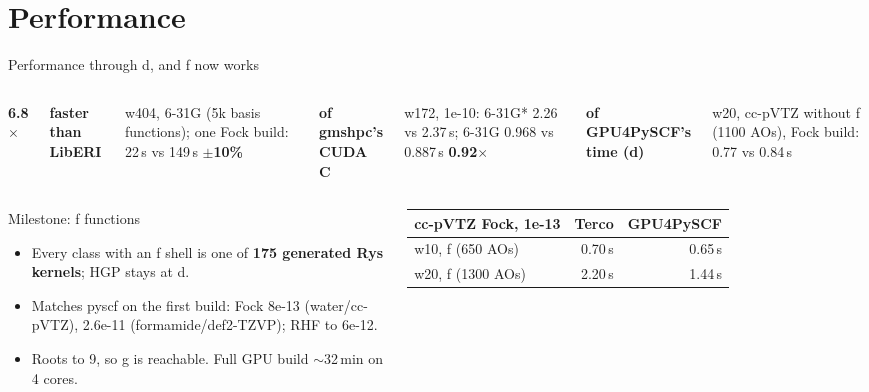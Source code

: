 \documentclass[aspectratio=169]{beamer}
\newcommand{\bignum}[2][fortranPurple]{{\fontsize{30}{32}\selectfont\bfseries\color{#1}#2}}
\newcommand{\cplx}[1]{{\footnotesize\color{cookieMuted}#1}}
\begin{document}
\section{Performance}

\begin{frame}{Performance through d, and f now works}
  \begin{columns}[T,onlytextwidth]
      \bignum{6.8$\times$}\par
      \textbf{faster than LibERI}\par
      \cplx{w404, 6-31G (5k basis functions); one Fock build: 22\,s vs 149\,s}
      \bignum[fortranPurpleMid]{$\pm$10\%}\par
      \textbf{of gmshpc's CUDA C}\par
      \cplx{w172, 1e-10: 6-31G* 2.26 vs 2.37\,s; 6-31G 0.968 vs 0.887\,s}
      \bignum{0.92$\times$}\par
      \textbf{of GPU4PySCF's time (d)}\par
      \cplx{w20, cc-pVTZ without f (1100 AOs), Fock build: 0.77 vs 0.84\,s}
  \end{columns}
  \vspace{.6em}
  \begin{columns}[T,onlytextwidth]
      \begin{exampleblock}{Milestone: f functions}
        \begin{itemize}\setlength\itemsep{2pt}\small
          \item Every class with an f shell is one of \textbf{175 generated Rys kernels}; HGP stays at d.
          \item Matches pyscf on the first build: Fock 8e-13 (water/cc-pVTZ), 2.6e-11 (formamide/def2-TZVP); RHF to 6e-12.
          \item Roots to 9, so g is reachable. Full GPU build $\sim$32\,min on 4 cores.
        \end{itemize}
      \end{exampleblock}
      \small
      \begin{tabular}{@{}lrr@{}}
        \toprule
        cc-pVTZ Fock, 1e-13 & Terco & GPU4PySCF \\
        \midrule
        w10, f (650 AOs)  & 0.70\,s & 0.65\,s \\
        w20, f (1300 AOs) & 2.20\,s & 1.44\,s \\

\end{tabular}
\end{columns}
\end{frame}
\end{document}
